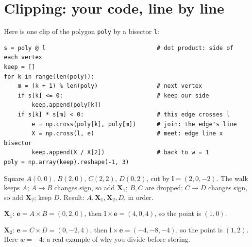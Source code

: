 \documentclass[11pt,a4paper]{article}
\newcommand{\vect}[1]{\mathbf{#1}}
\newcommand{\vl}{\vect{l}}
\newcommand{\vX}{\vect{X}}
\begin{document}
\section{Clipping: your code, line by line}\label{sec:clip}

Here is one clip of the polygon \texttt{poly} by a bisector \texttt{l}:
\begin{lstlisting}
s = poly @ l                                # dot product: side of each vertex
keep = []
for k in range(len(poly)):
    m = (k + 1) % len(poly)                 # next vertex
    if s[k] <= 0:                           # keep our side
        keep.append(poly[k])
    if s[k] * s[m] < 0:                     # this edge crosses l
        e = np.cross(poly[k], poly[m])      # join: the edge's line
        X = np.cross(l, e)                  # meet: edge line x bisector
        keep.append(X / X[2])               # back to w = 1
poly = np.array(keep).reshape(-1, 3)
\end{lstlisting}

\begin{center}
\end{center}

\begin{examplebox}
Square $A(0,0)$, $B(2,0)$, $C(2,2)$, $D(0,2)$, cut by $\vl=(2,0,-2)$. The walk keeps $A$; $A\to B$ changes sign, so add $\vX_1$;
$B,C$ are dropped; $C\to D$ changes sign, so add $\vX_2$; keep $D$. Result: $A,\vX_1,\vX_2,D$, in order.

$\vX_1$: $\vect{e}=A\times B=(0,2,0)$, then $\vl\times\vect{e}=(4,0,4)$, so the point is $(1,0)$.

$\vX_2$: $\vect{e}=C\times D=(0,-2,4)$, then $\vl\times\vect{e}=(-4,-8,-4)$, so the point is $(1,2)$. Here $w=-4$:
a real example of why you divide before storing.
\end{examplebox}
\end{document}
